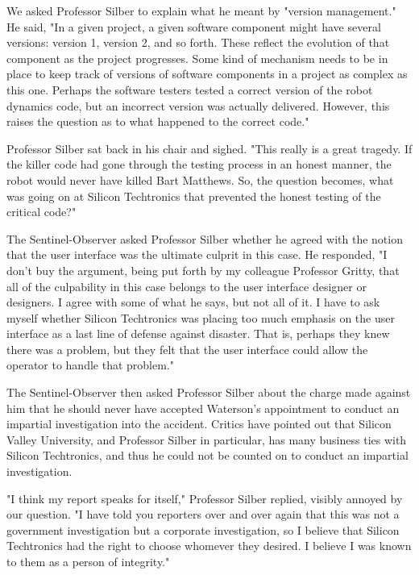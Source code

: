 We asked Professor Silber to explain what he meant by "version management." He said, "In a given project, a given software component might have several versions: version 1, version 2, and so forth. These reflect the evolution of that component as the project progresses. Some kind of mechanism needs to be in place to keep track of versions of software components in a project as complex as this one. Perhaps the software testers tested a correct version of the robot dynamics code, but an incorrect version was actually delivered. However, this raises the question as to what happened to the correct code."

Professor Silber sat back in his chair and sighed. "This really is a great tragedy. If the killer code had gone through the testing process in an honest manner, the robot would never have killed Bart Matthews. So, the question becomes, what was going on at Silicon Techtronics that prevented the honest testing of the critical code?"

The Sentinel-Observer asked Professor Silber whether he agreed with the notion that the user interface was the ultimate culprit in this case. He responded, "I don't buy the argument, being put forth by my colleague Professor Gritty, that all of the culpability in this case belongs to the user interface designer or designers. I agree with some of what he says, but not all of it. I have to ask myself whether Silicon Techtronics was placing too much emphasis on the user interface as a last line of defense against disaster. That is, perhaps they knew there was a problem, but they felt that the user interface could allow the operator to handle that problem."

The Sentinel-Observer then asked Professor Silber about the charge made against him that he should never have accepted Waterson's appointment to conduct an impartial investigation into the accident. Critics have pointed out that Silicon Valley University, and Professor Silber in particular, has many business ties with Silicon Techtronics, and thus he could not be counted on to conduct an impartial investigation.

"I think my report speaks for itself," Professor Silber replied, visibly annoyed by our question. "I have told you reporters over and over again that this was not a government investigation but a corporate investigation, so I believe that Silicon Techtronics had the right to choose whomever they desired. I believe I was known to them as a person of integrity."

